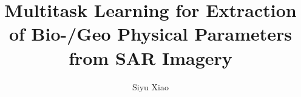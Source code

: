 \documentclass[bibtotoc,liststotoc,BCOR=5mm,DIV=12]{scrbook}
\author{Siyu Xiao}
\title{Multitask Learning for Extraction of Bio-/Geo Physical Parameters from SAR Imagery}
\begin{document}
\renewcommand{\chaptername}{Chapter}

\frontmatter

\maketitle
    
    
     
    \thispagestyle{empty}
    \cleardoublepage
    
    
    
    \thispagestyle{empty}
    \cleardoublepage
    
    \renewcommand{\contentsname}{Contents}
    
    \tableofcontents
    \thispagestyle{empty}
    
    
    

\mainmatter %
    
    
    
    
    
    \appendix



%
%
\renewcommand\bibname{References}


\backmatter
\end{document}
